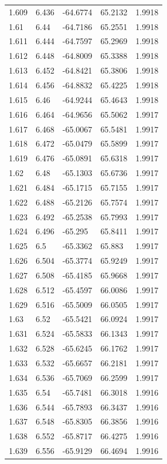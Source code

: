\begin{tabular}{lllll}
1.609 & 6.436 & -64.6774 & 65.2132 & 1.9918 \\
1.61 & 6.44 & -64.7186 & 65.2551 & 1.9918 \\
1.611 & 6.444 & -64.7597 & 65.2969 & 1.9918 \\
1.612 & 6.448 & -64.8009 & 65.3388 & 1.9918 \\
1.613 & 6.452 & -64.8421 & 65.3806 & 1.9918 \\
1.614 & 6.456 & -64.8832 & 65.4225 & 1.9918 \\
1.615 & 6.46 & -64.9244 & 65.4643 & 1.9918 \\
1.616 & 6.464 & -64.9656 & 65.5062 & 1.9917 \\
1.617 & 6.468 & -65.0067 & 65.5481 & 1.9917 \\
1.618 & 6.472 & -65.0479 & 65.5899 & 1.9917 \\
1.619 & 6.476 & -65.0891 & 65.6318 & 1.9917 \\
1.62 & 6.48 & -65.1303 & 65.6736 & 1.9917 \\
1.621 & 6.484 & -65.1715 & 65.7155 & 1.9917 \\
1.622 & 6.488 & -65.2126 & 65.7574 & 1.9917 \\
1.623 & 6.492 & -65.2538 & 65.7993 & 1.9917 \\
1.624 & 6.496 & -65.295 & 65.8411 & 1.9917 \\
1.625 & 6.5 & -65.3362 & 65.883 & 1.9917 \\
1.626 & 6.504 & -65.3774 & 65.9249 & 1.9917 \\
1.627 & 6.508 & -65.4185 & 65.9668 & 1.9917 \\
1.628 & 6.512 & -65.4597 & 66.0086 & 1.9917 \\
1.629 & 6.516 & -65.5009 & 66.0505 & 1.9917 \\
1.63 & 6.52 & -65.5421 & 66.0924 & 1.9917 \\
1.631 & 6.524 & -65.5833 & 66.1343 & 1.9917 \\
1.632 & 6.528 & -65.6245 & 66.1762 & 1.9917 \\
1.633 & 6.532 & -65.6657 & 66.2181 & 1.9917 \\
1.634 & 6.536 & -65.7069 & 66.2599 & 1.9917 \\
1.635 & 6.54 & -65.7481 & 66.3018 & 1.9916 \\
1.636 & 6.544 & -65.7893 & 66.3437 & 1.9916 \\
1.637 & 6.548 & -65.8305 & 66.3856 & 1.9916 \\
1.638 & 6.552 & -65.8717 & 66.4275 & 1.9916 \\
1.639 & 6.556 & -65.9129 & 66.4694 & 1.9916 \\

\end{tabular}
